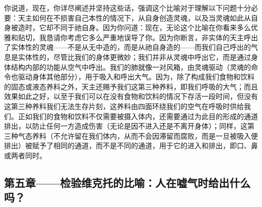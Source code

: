 你说道，现在，你详尽阐述并坚持这些话，强调这个比喻对于理解以下问题十分必要：天主如何在不损害自己本性的情况下，从自身创造灵魂，以及当灵魂如此从自身被造时，它却不同于祂自身。因为你问道：现在，无论这个比喻在你看来多么优雅和贴切，我恳请你考虑它多么严重地误导了你。因为你断言，非实体的天主呼出了实体性的灵魂——不是从无中造的，而是从祂自身造的——而我们自己呼出的气息是实体性的，尽管比我们的身体更微妙；我们并非从灵魂中呼出它，而是通过身体结构内部的功能从空气中呼出。我们的肺就像一对风箱，由灵魂驱动（灵魂的命令也驱动身体其他部分），用于吸入和呼出大气。因为，除了构成我们食物和饮料的固态或液态养料之外，天主还赐予我们这第三种养料，即我们呼吸的大气；而且效果如此之好，以至于我们可以在没有食物和饮料的情况下存活一段时间，但没有这第三种养料我们无法生存片刻，这养料由四面环绕我们的空气在呼吸时供给我们。正如我们的食物和饮料不仅需要被摄入体内，还需要通过为此目的形成的通道排出，以防止任何一方造成伤害（无论是因不进入还是不离开身体）；同样，这第三种气态养料（不允许留在我们体内，从而不会因滞留而腐败，而是一旦被吸入便排出）被赋予了相同的通道，而不是不同的通道，用于它的进入和排出，即口、鼻或两者同时。\par


\subsection{第五章——检验维克托的比喻：人在嘘气时给出什么吗？}

